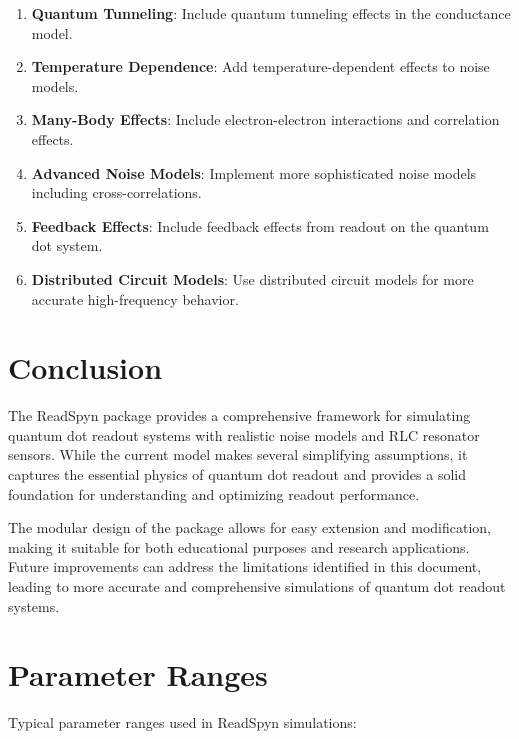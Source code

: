 \documentclass[11pt,a4paper]{article}
\begin{document}
\begin{enumerate}
\item \textbf{Quantum Tunneling}: Include quantum tunneling effects in the conductance model.
\item \textbf{Temperature Dependence}: Add temperature-dependent effects to noise models.
\item \textbf{Many-Body Effects}: Include electron-electron interactions and correlation effects.
\item \textbf{Advanced Noise Models}: Implement more sophisticated noise models including cross-correlations.
\item \textbf{Feedback Effects}: Include feedback effects from readout on the quantum dot system.
\item \textbf{Distributed Circuit Models}: Use distributed circuit models for more accurate high-frequency behavior.
\end{enumerate}

\section{Conclusion}

The ReadSpyn package provides a comprehensive framework for simulating quantum dot readout systems with realistic noise models and RLC resonator sensors. While the current model makes several simplifying assumptions, it captures the essential physics of quantum dot readout and provides a solid foundation for understanding and optimizing readout performance.

The modular design of the package allows for easy extension and modification, making it suitable for both educational purposes and research applications. Future improvements can address the limitations identified in this document, leading to more accurate and comprehensive simulations of quantum dot readout systems.

\appendix

\section{Parameter Ranges}

Typical parameter ranges used in ReadSpyn simulations:
\end{document}
